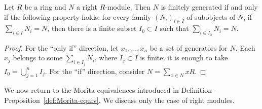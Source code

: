 
\begin{lemma}\label{prop:fg-module-cat}
	Let $R$ be a ring and $N$ a right $R$-module. Then $N$ is finitely
	generated if and only if the following property holds: for every family
	$(N_i)_{i \in I}$ of subobjects of $N$, if
	$\sum_{i \in I}N_i=N$, then there is a finite subset $I_0\subset I$ such
	that $\sum_{i \in I_0}N_i=N$.
\end{lemma}
\begin{proof}
	For the ``only if'' direction, let $x_1,\ldots,x_n$ be a set of generators
	for $N$. Each $x_j$ belongs to some $\sum_{i\in I_j}N_i$, where
	$I_j\subset I$ is finite; it is enough to take
	$I_0=\bigcup_{j=1}^n I_j$. For the ``if'' direction, consider
	$N=\sum_{x\in N}xR$.
\end{proof}

We now return to the Morita equivalences introduced in
Definition--Proposition~\ref{def:Morita-equiv}. We discuss only the case of
right modules.

